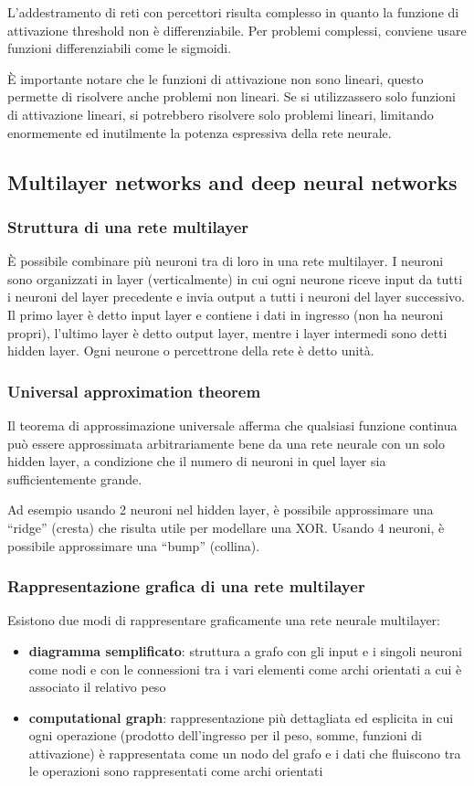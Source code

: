 L'addestramento di reti con percettori risulta complesso in quanto la funzione di attivazione threshold non è differenziabile.
Per problemi complessi, conviene usare funzioni differenziabili come le sigmoidi.

È importante notare che le funzioni di attivazione non sono lineari, questo permette di risolvere anche problemi non lineari.
Se si utilizzassero solo funzioni di attivazione lineari, si potrebbero risolvere solo problemi lineari, limitando enormemente
ed inutilmente la potenza espressiva della rete neurale.

\newpage

\subsection{Multilayer networks and deep neural networks}
\subsubsection*{Struttura di una rete multilayer}
È possibile combinare più neuroni tra di loro in una rete multilayer. I neuroni sono organizzati in layer (verticalmente) in
cui ogni neurone riceve input da tutti i neuroni del layer precedente e invia output a tutti i neuroni del layer successivo.
Il primo layer è detto input layer e contiene i dati in ingresso (non ha neuroni propri), l'ultimo layer è detto output layer,
mentre i layer intermedi sono detti hidden layer. Ogni neurone o percettrone della rete è detto unità.

\subsubsection*{Universal approximation theorem}
Il teorema di approssimazione universale afferma che qualsiasi funzione continua può essere approssimata arbitrariamente bene
da una rete neurale con un solo hidden layer, a condizione che il numero di neuroni in quel layer sia sufficientemente grande.

Ad esempio usando 2 neuroni nel hidden layer, è possibile approssimare una ``ridge'' (cresta) che risulta utile per modellare
una XOR. Usando 4 neuroni, è possibile approssimare una ``bump'' (collina).

\subsubsection*{Rappresentazione grafica di una rete multilayer}
Esistono due modi di rappresentare graficamente una rete neurale multilayer:
\begin{itemize}
	\item \textbf{diagramma semplificato}: struttura a grafo con gli input e i singoli neuroni come nodi e con le connessioni
	tra i vari elementi come archi orientati a cui è associato il relativo peso
	\item \textbf{computational graph}: rappresentazione più dettagliata ed esplicita in cui ogni operazione (prodotto
	dell'ingresso per il peso, somme, funzioni di attivazione) è rappresentata come un nodo del grafo e i dati che fluiscono
	tra le operazioni sono rappresentati come archi orientati
\end{itemize}

